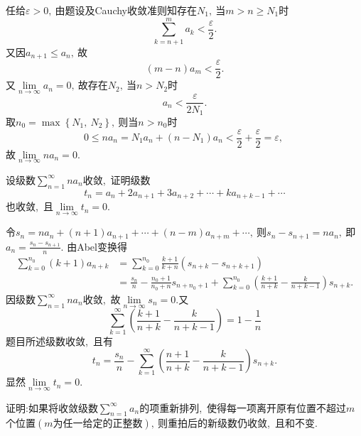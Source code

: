 	\begin{solution}
		任给$\varepsilon>0,\ $由题设及Cauchy收敛准则知存在$N_1,\ $当$m>n\ge N_1$时
		$$\sum\limits_{k=n+1}^{m}a_k<\frac{\varepsilon}{2}.$$
		又因$a_{n+1}\le a_n,\ $故
		$$(m-n)a_m<\frac{\varepsilon}{2}.$$
		又$\lim\limits_{n\rightarrow\infty}a_n=0,\ $故存在$N_2,\ $当$n>N_2$时
		$$a_n<\frac{\varepsilon}{2N_1}.$$
		取$n_0=\max\left\{N_1,\ N_2\right\},\ $则当$n>n_0$时
		$$0\le na_n=N_1a_n+\left(n-N_1\right)a_n<\frac{\varepsilon}{2}+\frac{\varepsilon}{2}=\varepsilon,\ $$
		故$\lim\limits_{n\rightarrow\infty}na_n=0.$ 
	\end{solution}
	\newpage
	\begin{problem}
		设级数$\sum\limits_{n=1}^{\infty}na_n$收敛,\ 证明级数
		$$t_n=a_n+2a_{n+1}+3a_{n+2}+\cdots+ka_{n+k-1}+\cdots$$
		也收敛,\ 且$\lim\limits_{n\rightarrow\infty}t_n=0.$
	\end{problem}
	
	\begin{solution}
		令$s_n=na_n+(n+1)a_{n+1}+\cdots+(n-m)a_{n+m}+\cdots,\ $则$s_n-s_{n+1}=na_n,\ $即$a_n=\frac{s_n-s_{n+1}}{n}.$
		由Abel变换得
		\begin{align*}
			\sum\limits_{k=0}^{n_0}(k+1)a_{n+k}&=\sum\limits_{k=0}^{n_0}\frac{k+1}{k+n}(s_{n+k}-s_{n+k+1})\\
			&=\frac{s_n}{n}-\frac{n_0+1}{n_0+n}s_{n+n_0+1}+\sum\limits_{k=0}^{n_0}\left(\frac{k+1}{n+k}-\frac{k}{n+k-1}\right)s_{n+k}.
		\end{align*}
		因级数$\sum\limits_{n=1}^{\infty}na_n$收敛,\ 故$\lim\limits_{n\rightarrow\infty}s_n=0.$又
		$$\sum\limits_{k=1}^{\infty}\left(\frac{k+1}{n+k}-\frac{k}{n+k-1}\right)=1-\frac{1}{n}$$
		题目所述级数收敛,\ 且有
		$$t_n=\frac{s_n}{n}-\sum\limits_{k=1}^{\infty}\left(\frac{n+1}{n+k}-\frac{k}{n+k-1}\right)s_{n+k}.$$
		显然$\lim\limits_{n\rightarrow\infty}t_n=0.$ 
	\end{solution}
	\newpage
	\begin{problem}
		证明:如果将收敛级数$\sum\limits_{n=1}^{\infty}a_n$的项重新排列,\ 使得每一项离开原有位置不超过$m$个位置$\left(m\text{为任一给定的正整数}\right),\ $则重拍后的新级数仍收敛,\ 且和不变.
	\end{problem}
	

